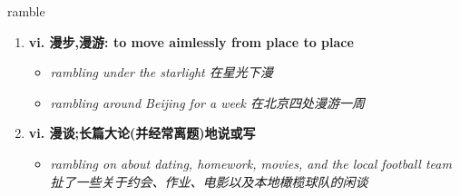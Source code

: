
\begin{frame}
{\huge ramble}
\begin{center}
\begin{enumerate}\Large
  \item \textbf{vi. 漫步,漫游: to move aimlessly from place to place}
  \begin{itemize}
    \item \em{\Large{rambling under the starlight 在星光下漫}}
    \item \em{\Large{rambling around Beijing for a week 在北京四处漫游一周}}
  \end{itemize}
  \item \textbf{vi. 漫谈;长篇大论(并经常离题)地说或写}
  \begin{itemize}
    \item \em{\Large{rambling on about dating, homework, movies, and the local football team 扯了一些关于约会、作业、电影以及本地橄榄球队的闲谈}}
  \end{itemize}
\end{enumerate}
\end{center}
\end{frame}
